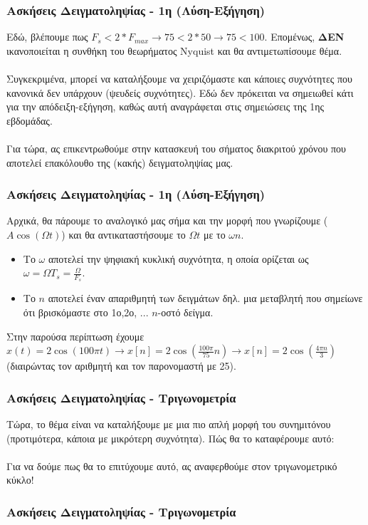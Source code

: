 \documentclass{beamer}
\begin{document}
\begin{frame}
		\frametitle{Ασκήσεις Δειγματοληψίας - 1η (Λύση-Εξήγηση)}
		Εδώ, βλέπουμε πως $F_s < 2*F_{max} \rightarrow 75 < 2*50 \rightarrow 75 < 100$. Επομένως, \textbf{ΔΕΝ} ικανοποιείται η συνθήκη του θεωρήματος \textlatin{Nyquist} και θα αντιμετωπίσουμε θέμα. \pause \\~\\
		Συγκεκριμένα, μπορεί να καταλήξουμε να χειριζόμαστε και κάποιες συχνότητες που κανονικά δεν υπάρχουν (ψευδείς συχνότητες). Εδώ δεν πρόκειται να σημειωθεί κάτι για την απόδειξη-εξήγηση, καθώς αυτή αναγράφεται στις σημειώσεις της 1ης εβδομάδας. \\~\\
		Για τώρα, ας επικεντρωθούμε στην κατασκευή του σήματος διακριτού χρόνου που αποτελεί επακόλουθο της (κακής) δειγματοληψίας μας.
\end{frame}

\begin{frame}
	\frametitle{Ασκήσεις Δειγματοληψίας - 1η (Λύση-Εξήγηση)}
	Αρχικά, θα πάρουμε το αναλογικό μας σήμα και την μορφή που γνωρίζουμε ($A\cos(\Omega t)$) και θα αντικαταστήσουμε το $\Omega t$ με το $\omega n$. 
	\begin{itemize}
		\item Το $\omega$ αποτελεί την ψηφιακή κυκλική συχνότητα, η οποία ορίζεται ως $\omega = \Omega T_s = \frac{\Omega}{F_s}$.
		\item Το $n$ αποτελεί έναν απαριθμητή των δειγμάτων δηλ. μια μεταβλητή που σημείωνε ότι βρισκόμαστε στο 1ο,2ο, ... $n$-οστό δείγμα.
	\end{itemize} 
	Στην παρούσα περίπτωση έχουμε $x(t)=2\cos(100\pi t) \rightarrow x[n] = 2\cos(\frac{100\pi}{75}n) \rightarrow x[n] = 2\cos(\frac{4\pi n}{3})$ (διαιρώντας τον αριθμητή και τον παρονομαστή με 25).
\end{frame}


\begin{frame}
	\frametitle{Ασκήσεις Δειγματοληψίας - Τριγωνομετρία}
	Τώρα, το θέμα είναι να καταλήξουμε με μια πιο απλή μορφή του συνημιτόνου (προτιμότερα, κάποια με μικρότερη συχνότητα). Πώς θα το καταφέρουμε αυτό$\colon$
	\pause \\~\\
	Για να δούμε πως θα το επιτύχουμε αυτό, ας αναφερθούμε στον τριγωνομετρικό κύκλο!
\end{frame}
\begin{frame}
		\frametitle{Ασκήσεις Δειγματοληψίας -  Τριγωνομετρία}
		\begin{center}
		\end{center}

\end{frame}
\end{document}
